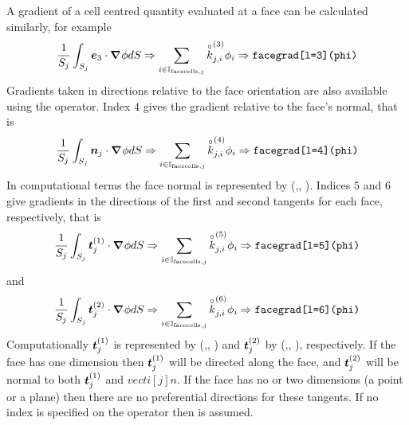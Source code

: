 A gradient of a cell centred quantity evaluated at a face can be calculated similarly, for example
%
\begin{equation}
\frac{1}{\scali[j]{S}} \int_{\scali[j]{S}} \vecti[3]{e} \cdot \vect{\nabla} \phi dS \Rightarrow \sum_{i \in \scali[\text{facecells},j]{\mathbb{I}}} \scali[j,i]{\facecentred{k}^{(3)}} \scali[i]{\phi} \Rightarrow \code{facegrad[l=3](phi)} \nonumber
\end{equation}
%
Gradients taken in directions relative to the face orientation are also available using the  operator.  Index $4$ gives the gradient relative to the face's normal, that is
%
\begin{equation}
\frac{1}{\scali[j]{S}} \int_{\scali[j]{S}} \vecti[j]{n} \cdot \vect{\nabla} \phi dS \Rightarrow \sum_{i \in \scali[\text{facecells},j]{\mathbb{I}}} \scali[j,i]{\facecentred{k}^{(4)}} \scali[i]{\phi} \Rightarrow \code{facegrad[l=4](phi)} \nonumber
\end{equation}
%
In computational terms the face normal is represented by (,, ).  Indices $5$ and $6$ give gradients in the directions of the first and second tangents for each face, respectively, that is
%
\begin{equation}
\frac{1}{\scali[j]{S}} \int_{\scali[j]{S}} \vecti[j]{t}^{(1)} \cdot \vect{\nabla} \phi dS \Rightarrow \sum_{i \in \scali[\text{facecells},j]{\mathbb{I}}} \scali[j,i]{\facecentred{k}^{(5)}} \scali[i]{\phi} \Rightarrow \code{facegrad[l=5](phi)} \nonumber
\end{equation}
%
and
%
\begin{equation}
\frac{1}{\scali[j]{S}} \int_{\scali[j]{S}} \vecti[j]{t}^{(2)} \cdot \vect{\nabla} \phi dS \Rightarrow \sum_{i \in \scali[\text{facecells},j]{\mathbb{I}}} \scali[j,i]{\facecentred{k}^{(6)}} \scali[i]{\phi} \Rightarrow \code{facegrad[l=6](phi)} \nonumber
\end{equation}
%
Computationally $\vecti[j]{t}^{(1)}$ is represented by (,, ) and $\vecti[j]{t}^{(2)}$ by (,, ), respectively.  If the face has one dimension then $\vecti[j]{t}^{(1)}$ will be directed along the face, and $\vecti[j]{t}^{(2)}$ will be normal to both $\vecti[j]{t}^{(1)}$ and $vecti[j]{n}$.  If the face has no or two dimensions (a point or a plane) then there are no preferential directions for these tangents.  If no index is specified on the  operator then  is assumed.


